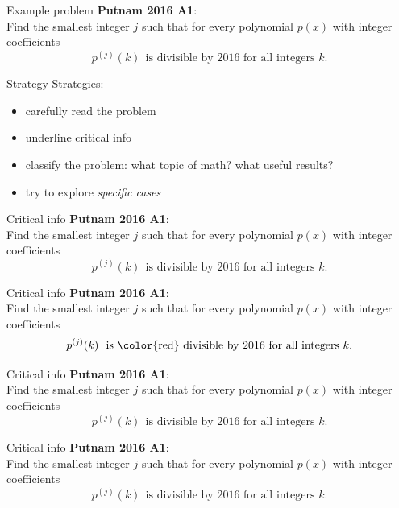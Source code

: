 \documentclass{beamer}
\begin{document}
\begin{frame}{Example problem}
\textbf{Putnam 2016 A1}:\\
Find the smallest integer $j$ such that for every polynomial $p(x)$ with integer coefficients
$$p^{(j)}(k)\ \ \text{is divisible by $2016$ for all integers $k$}.$$
\end{frame}

\begin{frame}{Strategy}
Strategies:
\pause
\begin{itemize}
\pause
\item carefully read the problem
\pause
\item underline critical info
\pause
\item classify the problem: what topic of math?  what useful results?
\pause
\item try to explore \emph{specific cases}
\end{itemize}
\end{frame}

\begin{frame}{Critical info}
\textbf{Putnam 2016 A1}:\\
Find the smallest integer $j$ such that for every polynomial $p(x)$ with integer coefficients
$$p^{(j)}(k)\ \ \text{is divisible by $2016$ for all integers $k$}.$$
\end{frame}

\begin{frame}{Critical info}
\textbf{Putnam 2016 A1}:\\
Find the smallest integer $j$ such that for every polynomial $p(x)$ with integer coefficients
$$p^{(j)}(k)\ \ \text{is {\color{red} divisible by $2016$} for all integers $k$}.$$
\end{frame}

\begin{frame}{Critical info}
\textbf{Putnam 2016 A1}:\\
Find the smallest integer $j$ such that for {\color{red}every polynomial} $p(x)$ with integer coefficients
$$p^{(j)}(k)\ \ \text{is divisible by $2016$ for all integers $k$}.$$
\end{frame}

\begin{frame}{Critical info}
\textbf{Putnam 2016 A1}:\\
Find the smallest integer $j$ such that for every polynomial $p(x)$ with {\color{red} integer coefficients}
$$p^{(j)}(k)\ \ \text{is divisible by $2016$ for all integers $k$}.$$
\end{frame}
\end{document}
